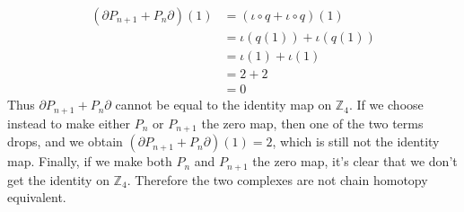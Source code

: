 \documentclass[12 pt]{article}
\newcommand{\Z}{\mathbb{Z}}
\newcommand{\p}{\partial}
\begin{document}
\begin{enumerate}[(a)]
\begin{align*}
(\p P_{n+1} + P_n \p) (1) &= (\iota \circ q + \iota \circ q) (1) \\
&=  \iota (q(1)) + \iota (q(1)) \\
&= \iota(1) + \iota(1) \\
&= 2 + 2 \\
&= 0
\end{align*}
Thus $\p P_{n+1} + P_n \p$ cannot be equal to the identity map on $\Z_4$. If we choose instead to make either
$P_n$ or $P_{n+1}$ the zero map, then one of the two terms drops, and we obtain $(\p P_{n+1} + P_n \p) (1)
= 2$, which is still not the identity map. Finally, if we make both $P_n$ and $P_{n+1}$ the zero map, it's clear
that we don't get the identity on $\Z_4$. Therefore the two complexes are not chain homotopy equivalent.
\end{enumerate}
\end{document}
